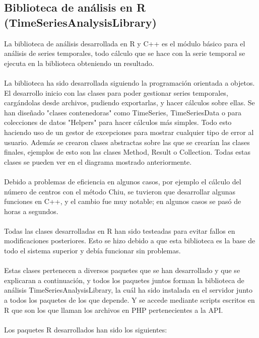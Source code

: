 \documentclass[14pt]{extarticle}
\theoremstyle{definition}
\theoremstyle{remark}
\begin{document}
\subsection{Biblioteca de análisis en R (TimeSeriesAnalysisLibrary)}\label{sec:bibliotecar}
La biblioteca de análisis desarrollada en R y C++ es el módulo básico para el análisis de series temporales, todo cálculo que se hace con la serie temporal se ejecuta en la biblioteca obteniendo un resultado.\\\\
La biblioteca ha sido desarrollada siguiendo la programación orientada a objetos. El desarrollo inicio con las clases para poder gestionar series temporales, cargándolas desde archivos, pudiendo exportarlas, y hacer cálculos sobre ellas. Se han diseñado "clases contenedoras" como TimeSeries, TimeSeriesData o para colecciones de datos "Helpers" para hacer cálculos más simples. Todo esto haciendo uso de un gestor de excepciones para mostrar cualquier tipo de error al usuario. Además se crearon clases abstractas sobre las que se crearían las clases finales, ejemplos de esto son las clases Method, Result o Collection. Todas estas clases se pueden ver en el diagrama mostrado anteriormente.\\\\
Debido a problemas de eficiencia en algunos casos, por ejemplo el cálculo del número de centros con el método Chiu, se tuvieron que desarrollar algunas funciones en C++, y el cambio fue muy notable; en algunos casos se pasó de horas a segundos.\\\\Todas las clases desarrolladas en R han sido testeadas para evitar fallos en modificaciones posteriores. Esto se hizo debido a que esta biblioteca es la base de todo el sistema superior y debía funcionar sin problemas.\\\\Estas clases pertenecen a diversos paquetes que se han desarrollado y que se explicaran a continuación, y todos los paquetes juntos forman la biblioteca de análisis TimeSeriesAnalysisLibrary, la cuál ha sido instalada en el servidor junto a todos los paquetes de los que depende. Y se accede mediante scripts escritos en R que son los que llaman los archivos en PHP pertenecientes a la API.\\\\Los paquetes R desarrollados han sido los siguientes:
\end{document}
